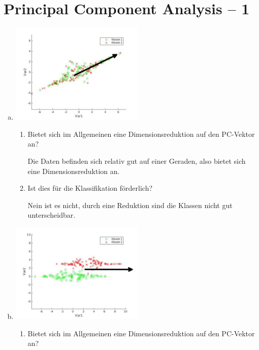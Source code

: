 \documentclass[a4paper]{scrartcl}
\begin{document}
\newpage

\section{Principal Component Analysis – 1}

\begin{enumerate}[(a)]
	\item \hfill
	
	\includegraphics[width=0.5\textwidth]{data/img1_pc.jpg}
		
	\begin{enumerate}[1.]
		\item Bietet sich im Allgemeinen eine Dimensionsreduktion auf den PC-Vektor an?
		
		Die Daten befinden sich relativ gut auf einer Geraden, also bietet sich eine Dimensionsreduktion an.
		
		\item Ist dies für die Klassifikation förderlich?
		
		Nein ist es nicht, durch eine Reduktion sind die Klassen nicht gut unterscheidbar.
		
	\end{enumerate}
	
	\item \hfill
	
	\includegraphics[width=0.5\textwidth]{data/img2_pc.jpg}
	
	\begin{enumerate}[1.]
		\item Bietet sich im Allgemeinen eine Dimensionsreduktion auf den PC-Vektor an?
		

\end{enumerate}
\end{enumerate}
\end{document}
